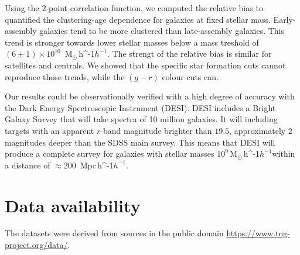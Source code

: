 \documentclass[fleqn,usenatbib]{mnras}
\newcommand{\Msunh}{\,{\rm M}$_{\odot}$\,\ifmmode h^{-1}\else $h^{-1}$\fi}
\newcommand{\Mpch}{\,{\rm Mpc}\,\ifmmode h^{-1}\else $h^{-1}$\fi}
\begin{document}
Using the 2-point correlation function, 
we computed the relative bias to  quantified the clustering-age
dependence for galaxies at fixed stellar mass.
Early-assembly galaxies tend to be more clustered than late-assembly galaxies.
This trend is stronger towards lower stellar masses below a mass
treshold of $(6\pm1)\times 10^{10}$ \Msunh.  
The strengt of the relative bias is similar for satellites and
centrals. 
We showed that the specific star formation cuts cannot reproduce those
trends, while the $(g-r)$ colour cuts can. 

Our results could be observationally verified with a high degree of
accuracy with the Dark Energy Spectroscopic Instrument (DESI).
DESI includes a Bright Galaxy Survey that will take spectra of
10 million galaxies.
It will including targets with an apparent $r$-band magnitude brighter
than $19.5$, approximately 2 magnitudes deeper than the SDSS
main survey.  
This means that DESI will produce a complete survey for galaxies with
stellar masses $10^{9}$\Msunh within a distance of $\approx 200$
\Mpch. 


\section*{Data availability}
The datasets were derived from sources in the public domain
\url{https://www.tng-project.org/data/}. 






\bsp	%
\label{lastpage}
\end{document}
